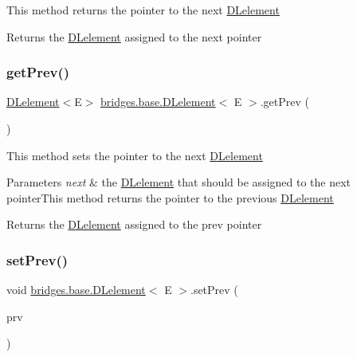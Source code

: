 This method returns the pointer to the next \mbox{\hyperlink{classbridges_1_1base_1_1_d_lelement}{D\+Lelement}}

\begin{DoxyReturn}{Returns}
the \mbox{\hyperlink{classbridges_1_1base_1_1_d_lelement}{D\+Lelement}} assigned to the next pointer 
\end{DoxyReturn}
\mbox{\label{classbridges_1_1base_1_1_d_lelement_a859f08f38513ecdfff0eb11bd2b98ce7}} 
\subsubsection{\texorpdfstring{getPrev()}{getPrev()}}
{\footnotesize\ttfamily \mbox{\hyperlink{classbridges_1_1base_1_1_d_lelement}{D\+Lelement}}$<$E$>$ \mbox{\hyperlink{classbridges_1_1base_1_1_d_lelement}{bridges.\+base.\+D\+Lelement}}$<$ E $>$.get\+Prev (\begin{DoxyParamCaption}{ }\end{DoxyParamCaption})}

This method sets the pointer to the next \mbox{\hyperlink{classbridges_1_1base_1_1_d_lelement}{D\+Lelement}}


\begin{DoxyParams}{Parameters}
{\em next} & the \mbox{\hyperlink{classbridges_1_1base_1_1_d_lelement}{D\+Lelement}} that should be assigned to the next pointer\+This method returns the pointer to the previous \mbox{\hyperlink{classbridges_1_1base_1_1_d_lelement}{D\+Lelement}}\\
\hline
\end{DoxyParams}
\begin{DoxyReturn}{Returns}
the \mbox{\hyperlink{classbridges_1_1base_1_1_d_lelement}{D\+Lelement}} assigned to the prev pointer 
\end{DoxyReturn}
\mbox{\label{classbridges_1_1base_1_1_d_lelement_a152a06add922290d48b2d4affc87d592}} 
\subsubsection{\texorpdfstring{setPrev()}{setPrev()}}
{\footnotesize\ttfamily void \mbox{\hyperlink{classbridges_1_1base_1_1_d_lelement}{bridges.\+base.\+D\+Lelement}}$<$ E $>$.set\+Prev (\begin{DoxyParamCaption}\item[{\mbox{\hyperlink{classbridges_1_1base_1_1_d_lelement}{D\+Lelement}}$<$ E $>$}]{prv }\end{DoxyParamCaption})}

